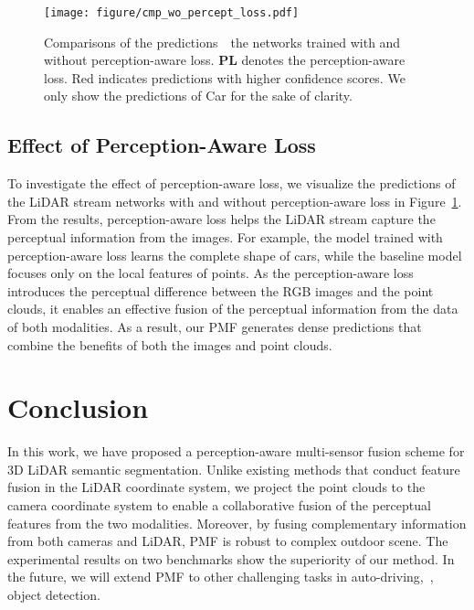 \documentclass[10pt,twocolumn,letterpaper]{article}
\newcommand{\hu}[1]{{\color{black}#1}}
\begin{document}
\begin{figure}
\centering
\texttt{[image: figure/cmp\_wo\_percept\_loss.pdf]}
\caption{Comparisons of the predictions~\wrt~the networks trained with and without perception-aware loss. \textbf{PL} denotes the perception-aware loss. Red indicates predictions with higher confidence scores. \hu{We only show the predictions of Car for the sake of clarity.}} \label{fig:visual_pred_conf}
\end{figure}

\subsection{Effect of Perception-Aware Loss}
To investigate the effect of perception-aware loss, we visualize the predictions of the LiDAR stream networks with and without perception-aware loss in Figure~\ref{fig:visual_pred_conf}. From the results, perception-aware loss helps the LiDAR stream capture the perceptual information from the images. For example, the model trained with perception-aware loss learns the complete shape of cars, while the baseline model focuses only on the local features of points. As the perception-aware loss introduces the perceptual difference between the RGB images and the point clouds, it enables an effective fusion of the perceptual information from the data of both modalities. As a result, our PMF generates dense predictions that combine the benefits of both the images and point clouds.











\section{Conclusion}
In this work, we have proposed a perception-aware multi-sensor fusion scheme for 3D LiDAR semantic segmentation. Unlike existing methods that conduct feature fusion in the LiDAR coordinate system, we project the point clouds to the camera coordinate system to enable a collaborative fusion of the perceptual features from the two modalities. Moreover, by fusing complementary information from both cameras and LiDAR, PMF is robust to complex outdoor scene. The experimental results on two benchmarks show the superiority of our method. In the future, we will extend PMF to other challenging tasks in auto-driving,~\eg, object detection. 
\end{document}
